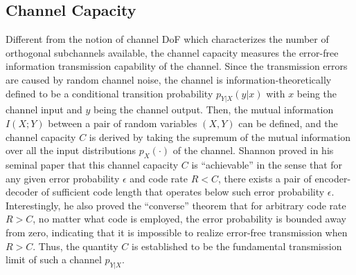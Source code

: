 \documentclass[journal,twocolumn]{IEEEtran}
\begin{document}


\subsection{Channel Capacity}
\label{Sec_2_Subsec_2}
Different from the notion of channel DoF which characterizes the number of orthogonal subchannels available, the channel capacity measures the error-free information transmission capability of the channel. 
Since the transmission errors are caused by random channel noise, the channel is information-theoretically defined to be a conditional transition probability $p_{Y|X}(y|x)$ with $x$ being the channel input and $y$ being the channel output. 
Then, the mutual information $I(X; Y)$ between a pair of random variables $(X, Y)$ can be defined, and the channel capacity $C$ is derived by taking the supremum of the mutual information over all the input distributions $p_X(\cdot)$ of the channel. Shannon proved in his seminal paper \cite{shannon1948mathematical} that this channel capacity $C$ is ``achievable'' in the sense that for any given error probability $\epsilon$ and code rate $R<C$, there exists a pair of encoder-decoder of sufficient code length that operates below such error probability $\epsilon$. 
Interestingly, he also proved the ``converse'' theorem that for arbitrary code rate $R>C$, no matter what code is employed, the error probability is bounded away from zero, indicating that it is impossible to realize error-free transmission when $R>C$. Thus, the quantity $C$ is established to be the fundamental transmission limit of such a channel $p_{Y|X}$. 
\end{document}
